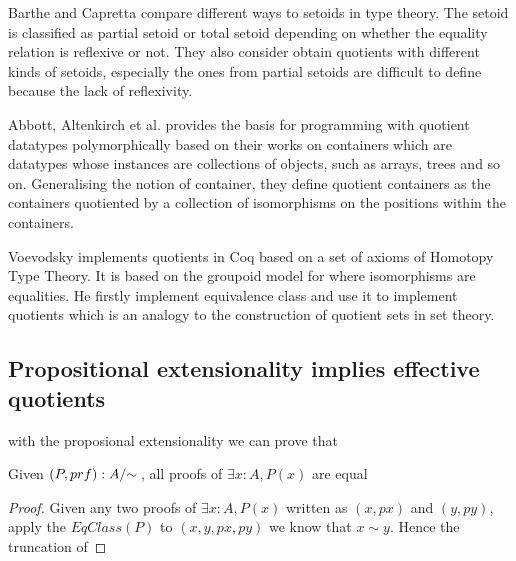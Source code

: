 Barthe and Capretta \cite{bar:03} compare different ways to setoids in type theory.
The setoid is classified as partial setoid or total setoid depending
on whether the equality relation is reflexive or not. They also
consider obtain quotients with different kinds of setoids, especially
the ones from partial setoids are difficult to define because the lack
of reflexivity.

Abbott, Altenkirch et al. \cite{abb:04} provides the basis for
programming with quotient datatypes polymorphically based on their
works on containers which are datatypes whose instances are
collections of objects, such as arrays, trees and so on. Generalising
the notion of container, they define quotient containers as the
containers quotiented by a collection of isomorphisms on the positions
within the containers.

Voevodsky \cite{voe:hset} implements quotients in Coq based on a set
of axioms of Homotopy Type Theory. It is based on the groupoid model
for \itt{} where isomorphisms are equalities. He firstly implement
equivalence class and use it to implement quotients which is an
analogy to the construction of quotient sets in set theory. 







\subsection{Propositional extensionality implies effective quotients}

with the proposional extensionality we can prove that
\begin{theorem}\label{thm-p-e}
Given $(P , prf) : \qset{A}$, all proofs of $\exists x : A, P (x)$ are equal
\end{theorem}

\begin{proof}
Given any two proofs of $\exists x : A, P (x)$ written as $(x , px)$ and $(y
, py)$, apply the $EqClass(P)$ to $(x, y, px, py)$ we know that $x
\sim y$. Hence the truncation of 
\end{proof}






